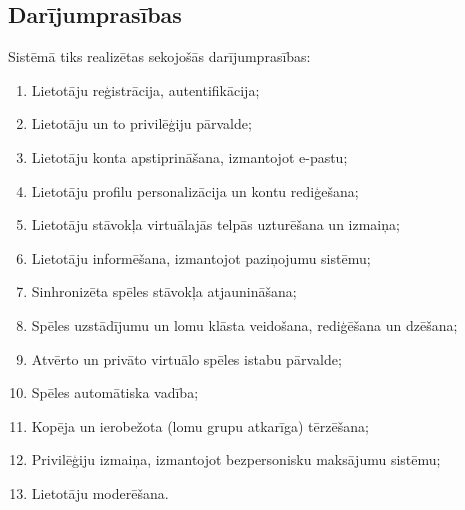 \subsection{Darījumprasības}

Sistēmā tiks realizētas sekojošās darījumprasības:
\begin{enumerate}
	\item Lietotāju reģistrācija, autentifikācija;
	\item Lietotāju un to privilēģiju pārvalde;
	\item Lietotāju konta apstiprināšana, izmantojot e-pastu;
	\item Lietotāju profilu personalizācija un kontu rediģešana;
	\item Lietotāju stāvokļa virtuālajās telpās uzturēšana un izmaiņa;
	\item Lietotāju informēšana, izmantojot paziņojumu sistēmu;
	\item Sinhronizēta spēles stāvokļa atjaunināšana;
	\item Spēles uzstādījumu un lomu klāsta veidošana, rediģēšana un dzēšana;
	\item Atvērto un privāto virtuālo spēles istabu pārvalde;
	\item Spēles automātiska vadība;
	\item Kopēja un ierobežota (lomu grupu atkarīga) tērzēšana;
	\item Privilēģiju izmaiņa, izmantojot bezpersonisku maksājumu sistēmu;
	\item Lietotāju moderēšana.
\end{enumerate}
